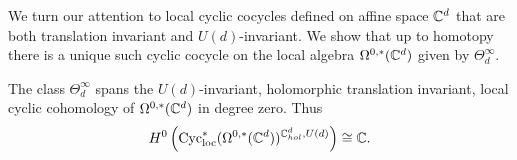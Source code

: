 We turn our attention to local cyclic cocycles defined on affine space $\mathbb C^d$ that are both translation invariant and $U(d)$-invariant. 
We show that up to homotopy there is a unique such cyclic cocycle on the local algebra  $\Omega^{0,*}(\mathbb C^d)$ given by $\Theta^\infty_d$. 

\begin{prop}
The class $\Theta^\infty_d$ spans the $U(d)$-invariant, holomorphic translation invariant, local cyclic cohomology of $\Omega^{0,*}(\mathbb C^d)$ in degree zero.
Thus
\[
H^0\left({\rm Cyc}_{\rm loc}^*(\Omega^{0,*}(\mathbb C^d))^{\mathbb C^d_{hol}, U(d)} \right) \cong \mathbb C .
\] 
\end{prop}

